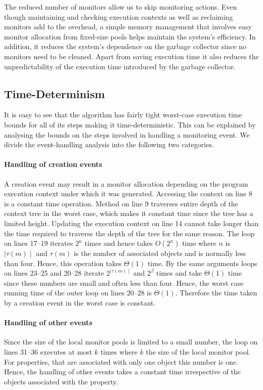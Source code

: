 The reduced number of monitors allow us to skip monitoring actions. Even though
maintaining and checking execution contexts as well as reclaiming monitors add to the overhead, 
a simple memory management that involves easy monitor allocation from fixed-size pools helps maintain the
system's efficiency. In addition, it reduces the system's dependence on the garbage collector since no
monitors need to be cleaned. Apart from saving execution time it also reduces the unpredictability
of the execution time introduced by the garbage collector.

\subsection{Time-Determinism}
\label{subsec:timedeterminism}

It is easy to see that the algorithm has fairly tight worst-case execution time bounds
for all of its steps making it time-deterministic. This can be explained
by analysing the bounds on the steps involved in handling a monitoring event.
We divide the event-handling analysis into the following two categories.

\paragraph{Handling of creation events} A creation event may result in a monitor
allocation depending on the program execution context under which it was generated.
Accessing the context on line 8 is a constant time operation. Method  on
line 9 traverses entire depth of the context tree in the worst case, which makes it
constant time since the tree has a limited height. Updating the execution context on line 14
cannot take longer than the time required to traverse the depth of the tree for the same reason.
The loop on lines 17--19 iterates $2^n$ times and hence takes $O(2^n)$ time 
where $n$ is $\mid\tau(m)\mid$ and $\tau(m)$ is the number of associated objects 
and is normally less than four. Hence, this operation takes $\Theta(1)$ time. By the same arguments
loops on lines 23--25 and 20--28 iterate $2^{\mid\tau(m)\mid}$ and $2^\beta$ times and take $\Theta(1)$
time since these numbers are small and often less than four. Hence, the worst case running time
of the outer loop on lines 20--28 is $\Theta(1)$. Therefore the time taken by a creation event in the
worst case is constant.

\paragraph{Handling of other events}
Since the size of the local monitor pools is limited to a small number, the loop on lines 31--36
executes at most $k$ times where $k$ the size of the local monitor pool. For properties, that are
associated with only one object this number is one. Hence, the handling of other events takes a
constant time irrespective of the objects associated with the property.

